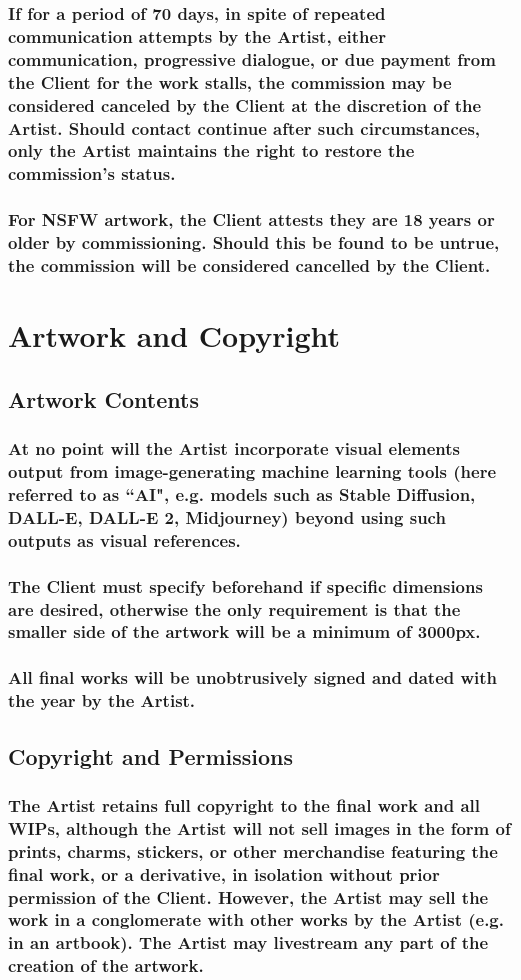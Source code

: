 \documentclass{article}
\newcommand{\subs}[2][]{\subsubsection[#1]{\normalfont #2}}
\begin{document}
\begin{flushleft}
		\subs[Unreachable Client]{If for a period of 70 days, in spite of repeated communication attempts by the Artist, either communication, progressive dialogue, or due payment from the Client for the work stalls, the commission may be considered canceled by the Client at the discretion of the Artist. Should contact continue after such circumstances, only the Artist maintains the right to restore the commission's status.}

		\subs[Age Restrictions]{For NSFW artwork, the Client attests they are 18 years or older by commissioning. Should this be found to be untrue, the commission will be considered cancelled by the Client.}

\leftskip=0cm
\section{Artwork and Copyright}

	\leftskip=1cm
	\subsection{Artwork Contents}

		\leftskip=2cm
		\subs[Artist AI Policy]{At no point will the Artist incorporate visual elements output from  image-generating machine learning tools (here referred to as ``AI", e.g. models such as Stable Diffusion, DALL-E, DALL-E 2, Midjourney) beyond using such outputs as visual references.}

		\subs[Artwork Dimensions]{The Client must specify beforehand if specific dimensions are desired, otherwise the only requirement is that the smaller side of the artwork will be a minimum of 3000px.}

		\subs[Signatures]{All final works will be unobtrusively signed and dated with the year by the Artist.}
	\leftskip=1cm
	\subsection{Copyright and Permissions}
	
		\leftskip=2cm
		\subs[Artist Copyright]{The Artist retains full copyright to the final work and all WIPs, although the Artist will not sell images in the form of prints, charms, stickers, or other merchandise featuring the final work, or a derivative, in isolation without prior permission of the Client. However, the Artist may sell the work in a conglomerate with other works by the Artist (e.g. in an artbook). The Artist may livestream any part of the creation of the artwork.}
		

\end{flushleft}
\end{document}
